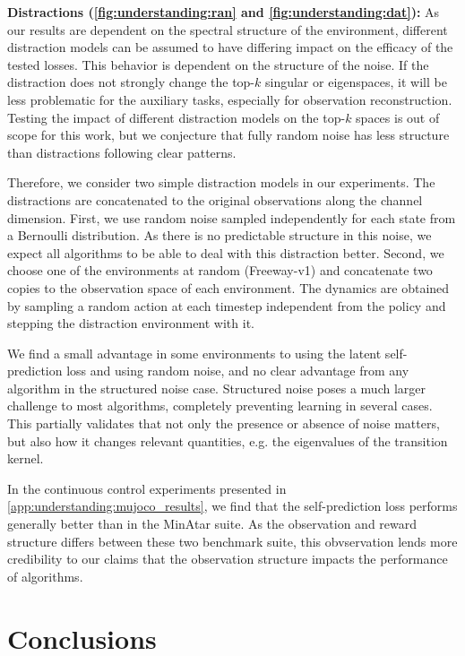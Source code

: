 \textbf{Distractions (\autoref{fig:understanding:ran} and \autoref{fig:understanding:dat}):}
As our results are dependent on the spectral structure of the environment, different distraction models can be assumed to have differing impact on the efficacy of the tested losses.
This behavior is dependent on the structure of the noise.
If the distraction does not strongly change the top-$k$ singular or eigenspaces, it will be less problematic for the auxiliary tasks, especially for observation reconstruction.
Testing the impact of different distraction models on the top-$k$ spaces is out of scope for this work, but we conjecture that fully random noise has less structure than distractions following clear patterns.

Therefore, we consider two simple distraction models in our experiments. 
The distractions are concatenated to the original observations along the channel dimension.
First, we use random noise sampled independently for each state from a Bernoulli distribution.
As there is no predictable structure in this noise, we expect all algorithms to be able to deal with this distraction better.
Second, we choose one of the environments at random (Freeway-v1) and concatenate two copies to the observation space of each environment.
The dynamics are obtained by sampling a random action at each timestep independent from the policy and stepping the distraction environment with it.

We find a small advantage in some environments to using the latent self-prediction loss and using random noise, and no clear advantage from any algorithm in the structured noise case.
Structured noise poses a much larger challenge to most algorithms, completely preventing learning in several cases.
This partially validates that not only the presence or absence of noise matters, but also how it changes relevant quantities, e.g. the eigenvalues of the transition kernel.

In the continuous control experiments presented in \autoref{app:understanding:mujoco_results}, we find that the self-prediction loss performs generally better than in the MinAtar suite.
As the observation and reward structure differs between these two benchmark suite, this obvservation lends more credibility to our claims that the observation structure impacts the performance of algorithms.

\section{Conclusions}

